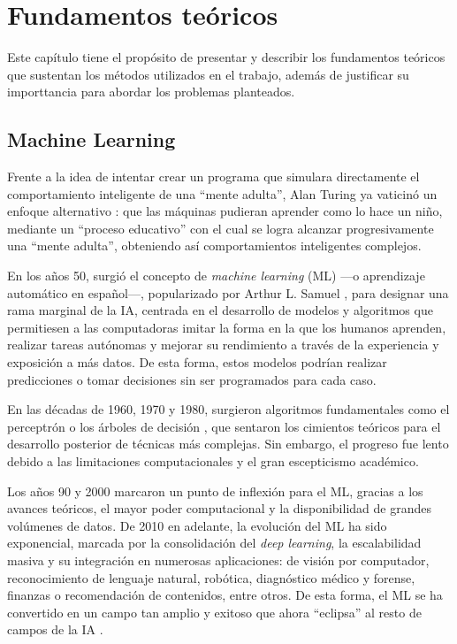 \chapter{Fundamentos teóricos}

Este capítulo tiene el propósito de presentar y describir los fundamentos teóricos que sustentan los métodos 
utilizados en el trabajo, además de justificar su importtancia para abordar los problemas planteados.


\section{Machine Learning}

Frente a la idea de intentar crear un programa que simulara directamente el comportamiento inteligente de una 
``mente adulta'', Alan Turing ya vaticinó un enfoque alternativo \cite{turing1950}: que las máquinas pudieran 
aprender como lo hace un niño, mediante un ``proceso educativo'' con el cual se logra alcanzar progresivamente 
una ``mente adulta'', obteniendo así comportamientos inteligentes complejos.

En los años 50, surgió el concepto de \textit{machine learning} (ML) ---o aprendizaje automático en
español---, popularizado por Arthur L. Samuel \cite{samuel1959}, para designar una rama marginal de la IA, 
centrada en el desarrollo de modelos y algoritmos que permitiesen a las 
computadoras imitar la forma en la que los humanos aprenden, realizar tareas autónomas y mejorar su 
rendimiento a través de la experiencia y exposición a más datos. De esta forma, estos modelos podrían realizar 
predicciones o tomar decisiones sin ser programados para cada caso.

En las décadas de 1960, 1970 y 1980, surgieron algoritmos fundamentales como el perceptrón 
\cite{mcculloch1943,rosenblatt1958} o los árboles de decisión \cite{quinlan1986}, 
que sentaron los cimientos teóricos para el desarrollo posterior de técnicas más complejas.  
Sin embargo, el progreso fue lento debido a las limitaciones computacionales y el gran escepticismo académico. 

Los años 90 y 2000 marcaron un punto de inflexión para el ML, gracias a los avances teóricos, el mayor poder 
computacional y la disponibilidad de grandes volúmenes de datos. De 2010 en adelante, la evolución del ML ha 
sido exponencial, marcada por la consolidación del \textit{deep learning}, la escalabilidad masiva y su 
integración en numerosas aplicaciones: de visión por computador, reconocimiento de lenguaje natural, robótica, 
diagnóstico médico y forense, finanzas o recomendación de contenidos, entre otros. De esta forma, el ML se ha 
convertido en un campo tan amplio y exitoso que ahora ``eclipsa'' al resto de campos de la IA 
\cite{domingos2015}.

